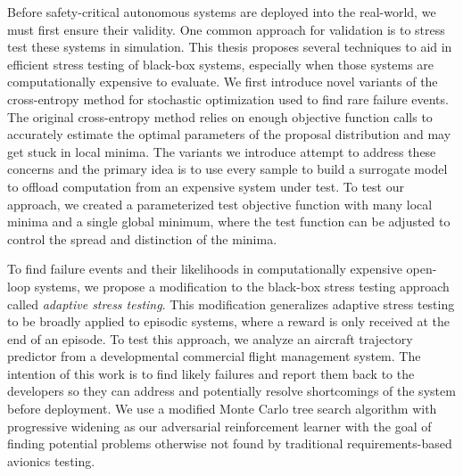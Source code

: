 Before safety-critical autonomous systems are deployed into the real-world, we must first ensure their validity.
One common approach for validation is to stress test these systems in simulation.
This thesis proposes several techniques to aid in efficient stress testing of black-box systems, especially when those systems are computationally expensive to evaluate.
We first introduce novel variants of the cross-entropy method for stochastic optimization used to find rare failure events.
The original cross-entropy method relies on enough objective function calls to accurately estimate the optimal parameters of the proposal distribution and may get stuck in local minima.
The variants we introduce attempt to address these concerns and the primary idea is to use every sample to build a surrogate model to offload computation from an expensive system under test.
To test our approach, we created a parameterized test objective function with many local minima and a single global minimum, where the test function can be adjusted to control the spread and distinction of the minima.

To find failure events and their likelihoods in computationally expensive open-loop systems, we propose a modification to the black-box stress testing approach called \textit{adaptive stress testing}.
This modification generalizes adaptive stress testing to be broadly applied to episodic systems, where a reward is only received at the end of an episode.
To test this approach, we analyze an aircraft trajectory predictor from a developmental commercial flight management system.
The intention of this work is to find likely failures and report them back to the developers so they can address and potentially resolve shortcomings of the system before deployment. 
We use a modified Monte Carlo tree search algorithm with progressive widening as our adversarial reinforcement learner with the goal of finding potential problems otherwise not found by traditional requirements-based avionics testing.

